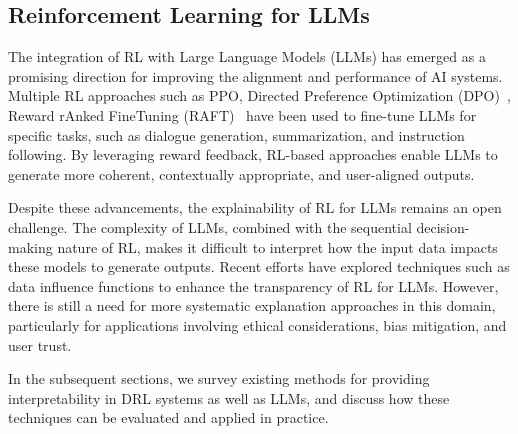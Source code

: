 
\subsection{Reinforcement Learning for LLMs}

The integration of RL with Large Language Models (LLMs) has emerged as a promising direction for improving the alignment and performance of AI systems. Multiple RL approaches such as PPO, Directed Preference Optimization (DPO)~\citep{rafailov2024direct}, Reward rAnked FineTuning (RAFT)~\citep{dong2023raft} have been used to fine-tune LLMs for specific tasks, such as dialogue generation, summarization, and instruction following. By leveraging reward feedback, RL-based approaches enable LLMs to generate more coherent, contextually appropriate, and user-aligned outputs.

Despite these advancements, the explainability of RL for LLMs remains an open challenge. The complexity of LLMs, combined with the sequential decision-making nature of RL, makes it difficult to interpret how the input data impacts these models to generate outputs. Recent efforts have explored techniques such as data influence functions to enhance the transparency of RL for LLMs. However, there is still a need for more systematic explanation approaches in this domain, particularly for applications involving ethical considerations, bias mitigation, and user trust.


In the subsequent sections, we survey existing methods for providing interpretability in DRL systems as well as LLMs, and discuss how these techniques can be evaluated and applied in practice.

